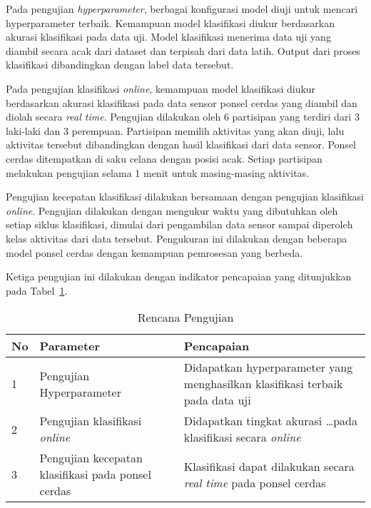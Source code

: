 Pada pengujian \textit{hyperparameter}, berbagai konfigurasi model diuji untuk mencari hyperparameter terbaik. Kemampuan model klasifikasi diukur berdasarkan akurasi klasifikasi pada data uji. Model klasifikasi menerima data uji yang diambil secara acak dari dataset dan terpisah dari data latih. Output dari proses klasifikasi dibandingkan dengan label data tersebut.

Pada pengujian klasifikasi \textit{online}, kemampuan model klasifikasi diukur berdasarkan akurasi klasifikasi pada data sensor ponsel cerdas yang diambil dan diolah secara \textit{real time}. Pengujian dilakukan oleh 6 partisipan yang terdiri dari 3 laki-laki dan 3 perempuan. Partisipan memilih aktivitas yang akan diuji, lalu aktivitas tersebut dibandingkan dengan hasil klasifikasi dari data sensor. Ponsel cerdas ditempatkan di saku celana dengan posisi acak. Setiap partisipan melakukan pengujian selama 1 menit untuk masing-masing aktivitas.

Pengujian kecepatan klasifikasi dilakukan bersamaan dengan pengujian klasifikasi \textit{online}. Pengujian dilakukan dengan mengukur waktu yang dibutuhkan oleh setiap siklus klasifikasi, dimulai dari pengambilan data sensor sampai diperoleh kelas aktivitas dari data tersebut. Pengukuran ini dilakukan dengan beberapa model ponsel cerdas dengan kemampuan pemrosesan yang berbeda.

Ketiga pengujian ini dilakukan dengan indikator pencapaian yang ditunjukkan pada Tabel~\ref{table:rencana-pengujian}.

\begin{table}[ht]
    \centering
    \caption{Rencana Pengujian}
    \begin{tabular}{ |p{0.5cm}|p{5cm}|p{7.5cm}| }
        \hline
        \textbf{No} & \textbf{Parameter} & \textbf{Pencapaian} \\

        \hline
        1 & Pengujian Hyperparameter & Didapatkan hyperparameter yang menghasilkan klasifikasi terbaik pada data uji \\

        \hline
        2 & Pengujian klasifikasi \textit{online} & Didapatkan tingkat akurasi \dots pada klasifikasi secara \textit{online} \\
        
        \hline
        3 & Pengujian kecepatan klasifikasi pada ponsel cerdas & Klasifikasi dapat dilakukan secara \textit{real time} pada ponsel cerdas \\

        \hline
    \end{tabular}
    \label{table:rencana-pengujian}
\end{table}
